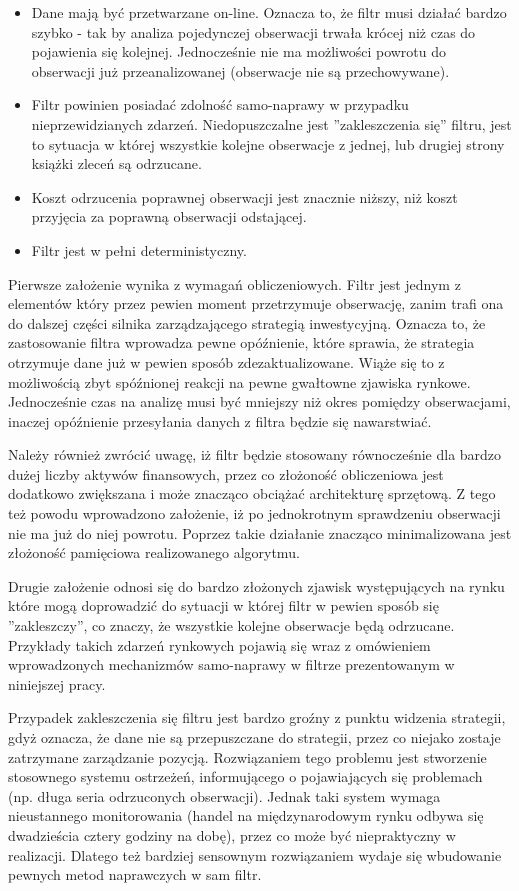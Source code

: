 \documentclass[a4paper,12pt,openany, DIV=calc, headsepline]{scrbook}
\begin{document}
\begin{itemize}
\item Dane mają być przetwarzane on-line. Oznacza to, że filtr musi działać bardzo szybko - tak by analiza pojedynczej obserwacji trwała krócej niż czas do pojawienia się kolejnej. Jednocześnie nie ma możliwości powrotu do obserwacji już przeanalizowanej (obserwacje nie są przechowywane).
\item Filtr powinien posiadać zdolność samo-naprawy w przypadku nieprzewidzianych zdarzeń. Niedopuszczalne jest ''zakleszczenia się'' filtru, jest to sytuacja w której wszystkie kolejne obserwacje z jednej, lub drugiej strony książki zleceń są odrzucane.
\item Koszt odrzucenia poprawnej obserwacji jest znacznie niższy, niż koszt przyjęcia za poprawną obserwacji odstającej. 
\item Filtr jest w pełni deterministyczny.
\end{itemize} 

Pierwsze założenie wynika z wymagań obliczeniowych. Filtr jest jednym z elementów który przez pewien moment przetrzymuje obserwację, zanim trafi ona do dalszej części silnika zarządzającego strategią inwestycyjną. Oznacza to, że zastosowanie filtra wprowadza pewne opóźnienie, które sprawia, że strategia otrzymuje dane już w pewien sposób zdezaktualizowane. Wiąże się to z możliwością  zbyt spóźnionej reakcji na pewne gwałtowne zjawiska rynkowe. Jednocześnie czas na analizę musi być mniejszy niż okres pomiędzy obserwacjami, inaczej opóźnienie przesyłania danych z filtra będzie się nawarstwiać.

Należy również zwrócić uwagę, iż filtr będzie  stosowany równocześnie dla bardzo dużej liczby aktywów finansowych, przez co złożoność obliczeniowa jest dodatkowo zwiększana i może znacząco obciążać architekturę sprzętową. Z tego też powodu wprowadzono założenie, iż po jednokrotnym sprawdzeniu obserwacji nie ma już do niej powrotu. Poprzez takie działanie znacząco minimalizowana jest złożoność pamięciowa realizowanego algorytmu.

Drugie założenie odnosi się do bardzo złożonych zjawisk występujących na rynku które mogą doprowadzić do sytuacji w której filtr w pewien sposób się ''zakleszczy'', co znaczy, że wszystkie kolejne obserwacje będą odrzucane. Przykłady takich zdarzeń rynkowych  pojawią się wraz z omówieniem wprowadzonych mechanizmów samo-naprawy w filtrze prezentowanym w niniejszej pracy.

Przypadek zakleszczenia się filtru jest bardzo groźny z punktu widzenia strategii, gdyż oznacza, że dane nie są przepuszczane do strategii, przez co niejako zostaje zatrzymane zarządzanie pozycją. Rozwiązaniem tego problemu jest stworzenie stosownego systemu ostrzeżeń, informującego o pojawiających się problemach (np. długa seria odrzuconych obserwacji). Jednak taki system wymaga nieustannego monitorowania (handel na międzynarodowym rynku odbywa się dwadzieścia cztery godziny na dobę), przez co może być niepraktyczny w realizacji. Dlatego też bardziej sensownym rozwiązaniem wydaje się wbudowanie pewnych metod naprawczych w sam filtr.
\end{document}
